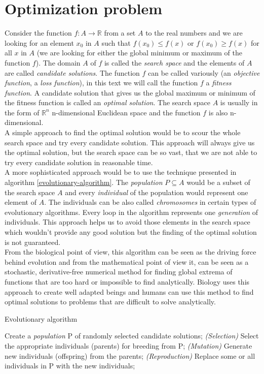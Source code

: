 \section{Optimization problem}
Consider the function $f: A \to \mathbb{R}$ from a set $A$ to the real numbers and we are looking for an element $x_0$ in $A$ such that $f(x_0) \leq f(x)$ or $f(x_0) \geq f(x)$ for all $x$ in $A$ (we are looking for either the global minimum or maximum of the function $f$). The domain $A$ of $f$ is called the \textit{search space} and the elements of $A$ are called \textit{candidate solutions}. The function $f$ can be called variously (an \textit{objective function}, a \textit{loss function}), in this text we will call the function $f$ a \textit{fitness function}. A candidate solution that gives us the global maximum or minimum of the fitness function is called an \textit{optimal solution}. The search space $A$ is usually in the form of $\mathbb{R}^n$ n-dimensional Euclidean space and the function $f$ is also n-dimensional.\\
A simple approach to find the optimal solution would be to scour the whole search space and try every candidate solution. This approach will always give us the optimal solution, but the search space can be so vast, that we are not able to try every candidate solution in reasonable time.\\
A more sophisticated approach would be to use the technique presented in algorithm \ref{evolutionary-algorithm}. The \textit{population} $P \subseteq A$ would be a subset of the search space $A$ and every \textit{individual} of the population would represent one element of $A$. The individuals can be also called \textit{chromosomes} in certain types of evolutionary algorithms. Every loop in the algorithm represents one \textit{generation} of individuals. This approach helps us to avoid those elements in the search space which wouldn't provide any good solution but the finding of the optimal solution is not guaranteed.\\
From the biological point of view, this algorithm can be seen as the driving force behind evolution and from the mathematical point of view it, can be seen as a stochastic, derivative-free numerical method for finding global extrema of functions that are too hard or impossible to find analytically.
Biology uses this approach to create well adapted beings and humans can use this method to find optimal solutions to problems that are difficult to solve analytically.

\begin{algorithm}
	\caption{Evolutionary algorithm}\label{evolutionary-algorithm}
	\begin{algorithmic}[1]
		\State Create a \textit{population} P of randomly selected candidate solutions;
		    \State \textit{(Selection)} Select the appropriate individuals (parents) for breeding from P;
		    \State \textit{(Mutation)} Generate new individuals (offspring) from the parents;
		    \State \textit{(Reproduction)} Replace some or all individuals in P with the new individuals;
		\EndWhile
	\end{algorithmic}
\end{algorithm}


